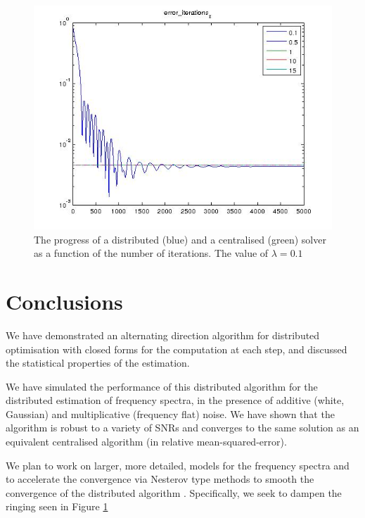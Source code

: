 \documentclass[conference]{IEEEtran}
\begin{document}
\begin{figure}[h]
\centering
\includegraphics[height = 7.3 cm]{mse_iterations.jpg}
\caption{The progress of a distributed (blue) and a centralised (green) solver as a function of the number of iterations. The value of \(\lambda = 0.1\)}
\label{fig:erroriterations}
\end{figure}

\section{Conclusions}
We have demonstrated an alternating direction algorithm for distributed optimisation with closed forms for the computation at each step, and discussed the statistical properties of the estimation. 

We have simulated the performance of this distributed algorithm for the distributed estimation of frequency spectra, in the presence of additive (white, Gaussian) and multiplicative (frequency flat) noise. We have shown that the algorithm is robust to a variety of SNRs and converges to the same solution as an equivalent centralised algorithm (in relative mean-squared-error).

We plan to work on larger, more detailed, models for the frequency spectra and to accelerate the convergence via Nesterov type methods to smooth the convergence of the distributed algorithm \cite{goldstein2014fast}. Specifically, we seek to dampen the ringing seen in Figure \ref{fig:erroriterations}


\end{document}
